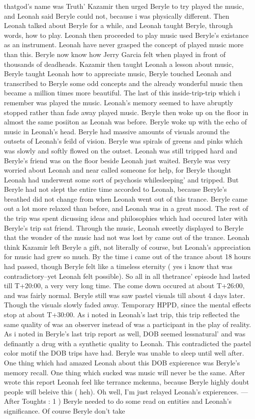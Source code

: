 \documentclass[12pt]{book}
\begin{document}
thatgod's name was Truth' Kazamir then urged Beryle to try played the music, and Leonah said Beryle could not, because i was physically different. Then Leonah talked about Beryle for a while, and Leonah taught Beryle, through words, how to play. Leonah then proceeded to play music used Beryle's existance as an instrument. Leonah have never grasped the concept of played music more than this. Beryle now know how Jerry Garcia felt when played in front of thousands of deadheads. Kazamir then taught Leonah a lesson about music, Beryle taught Leonah how to appreciate music, Beryle touched Leonah and transcribed to Beryle some odd concepts and the already wonderful music then became a million times more beautiful. The last of this inside-trip-trip which i remember was played the music. Leonah's memory seemed to have abruptly stopped rather than fade away played music. Beryle then woke up on the floor in almost the same posiiton as Leonah was before. Beryle woke up with the echo of music in Leonah's head. Beryle had massive amounts of visuals around the outsets of Leonah's feild of vision. Beryle was spirals of greens and pinks which was slowly and softly flowed on the outset. Leonah was still tripped hard and Beryle's friend was on the floor beside Leonah just waited. Beryle was very worried about Leonah and near called someone for help, for Beryle thought Leonah had underwent some sort of psychosis whilesleeping' and tripped. But Beryle had not slept the entire time accorded to Leonah, because Beryle's breathed did not change from when Leonah went out of this trance. Beryle came out a lot more relaxed than before, and Leonah was in a great mood. The rest of the trip was spent dicussing ideas and philosophies which had occured later with Beryle's trip sat friend. Through the music, Leonah sweetly displayed to Beryle that the wonder of the music had not was lost by came out of the trance. Leonah think Kazamir left Beryle a gift, not literally of course, but Leonah's appreciation for music had grew so much. By the time i came out of the trance about 18 hours had passed, though Beryle felt like a timeless eternity ( yes i know that was contradictory--yet Leonah felt possible). So all in all thetrance' episode had lasted till T+20:00, a very very long time. The come down occured at about T+26:00, and was fairly normal. Beryle still was saw pastel visuals till about 4 days later. Though the visuals slowly faded away. Temporary HPPD, since the mental effects stop at about T+30:00. As i noted in Leonah's last trip, this trip reflected the same quality of was an observer instead of was a participant in the play of reality. As i noted in Beryle's last trip report as well, DOB seemed lessnatural' and was definantly a drug with a synthetic quality to Leonah. This contradicted the pastel color motif the DOB trips have had. Beryle was unable to sleep until well after. One thing which had amazed Leonah about this DOB expierence was Beryle's memory recall. One thing which sucked was music will never be the same. After wrote this report Leonah feel like terrance mckenna, because Beryle highly doubt people will beleive this ( heh). Oh well, I'm just relayed Leonah's expierences. --- After Toughts : 1 ) Beryle needed to do some read on entities and Leonah's significance. Of course Beryle don't take 
\end{document}
